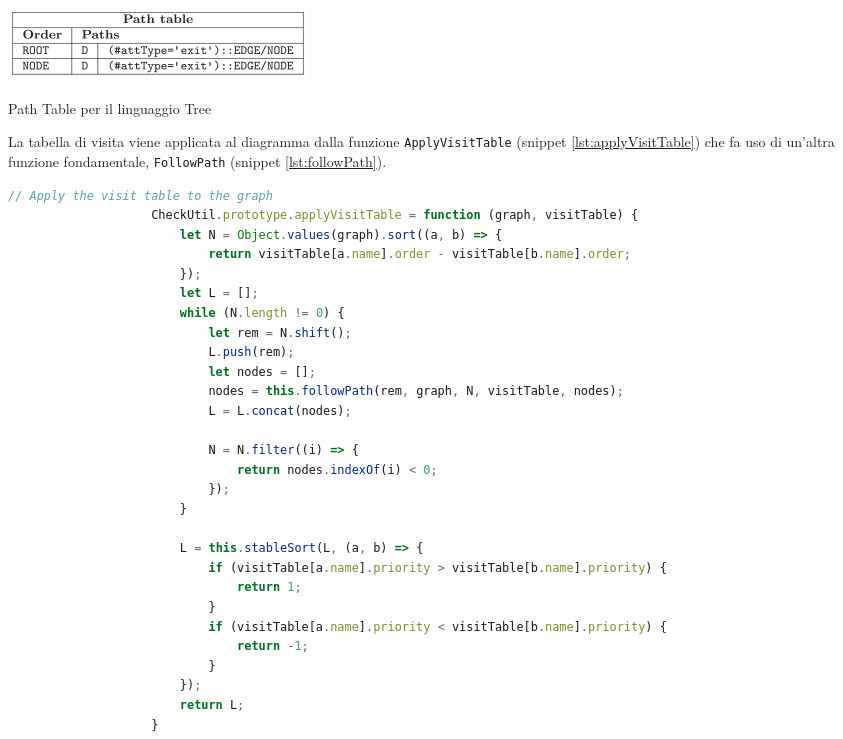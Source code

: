                 \begin{table}[htbp]
                    \centering
                    \includegraphics[scale=0.85]{Figure/pathTable.PNG}
                    \caption{Path Table per il linguaggio Tree}
                    \label{tab:pathTable}
                \end{table}

                La tabella di visita viene applicata al diagramma dalla funzione \texttt{ApplyVisitTable} (snippet \ref{lst:applyVisitTable}) che fa uso di un'altra funzione fondamentale, \texttt{FollowPath} (snippet \ref{lst:followPath}).
                \newpage
                \begin{lstlisting}[language=JavaScript, basicstyle=\tiny, caption={La funzione applyVisitTable}, label={lst:applyVisitTable}]
                    // Apply the visit table to the graph
                    CheckUtil.prototype.applyVisitTable = function (graph, visitTable) {
                        let N = Object.values(graph).sort((a, b) => {
                            return visitTable[a.name].order - visitTable[b.name].order;
                        });
                        let L = [];
                        while (N.length != 0) {
                            let rem = N.shift();
                            L.push(rem);
                            let nodes = [];
                            nodes = this.followPath(rem, graph, N, visitTable, nodes);
                            L = L.concat(nodes);

                            N = N.filter((i) => {
                                return nodes.indexOf(i) < 0;
                            });
                        }

                        L = this.stableSort(L, (a, b) => {
                            if (visitTable[a.name].priority > visitTable[b.name].priority) {
                                return 1;
                            }
                            if (visitTable[a.name].priority < visitTable[b.name].priority) {
                                return -1;
                            }
                        });
                        return L;
                    }
                \end{lstlisting}

